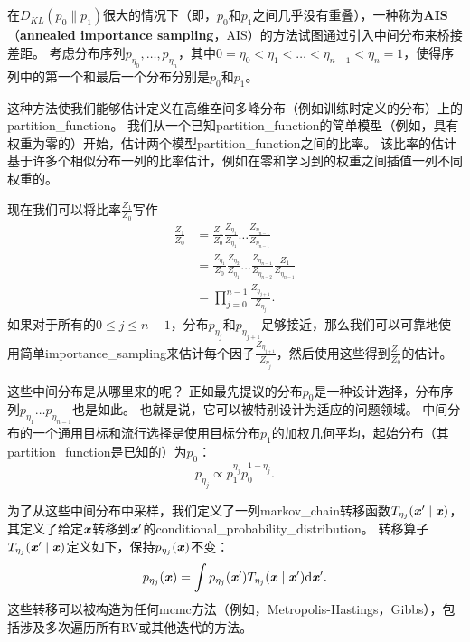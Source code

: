 \subsection{}
\label{sec:annealed_importance_sampling}
在$D_{KL}(p_0 \| p_1)$很大的情况下（即，$p_0$和$p_1$之间几乎没有重叠），一种称为\textbf{\gls{AIS}}（\textbf{annealed importance sampling}，AIS）的方法试图通过引入中间分布来桥接差距\citep{Jarzynski1997,Neal-2001}。
考虑分布序列$p_{\eta_0},\dots,p_{\eta_n}$，其中$0=\eta_0 < \eta_1 < \dots < \eta_{n-1} < \eta_n = 1$，使得序列中的第一个和最后一个分布分别是$p_0$和$p_1$。


这种方法使我们能够估计定义在高维空间多峰分布（例如训练时定义的分布）上的\gls{partition_function}。
我们从一个已知\gls{partition_function}的简单模型（例如，具有权重为零的）开始，估计两个模型\gls{partition_function}之间的比率。
该比率的估计基于许多个相似分布一列的比率估计，例如在零和学习到的权重之间插值一列不同权重的。


现在我们可以将比率$\frac{Z_1}{Z_0}$写作
\begin{align}
\frac{Z_1}{Z_0} &= \frac{Z_1}{Z_0} \frac{Z_{\eta_1}}{Z_{\eta_1}} \dots \frac{Z_{\eta_{n-1}}}{Z_{\eta_{n-1}}} \\
&= \frac{Z_{\eta_1}}{Z_{0}}  \frac{Z_{\eta_2}}{Z_{\eta_1}}  \dots \frac{Z_{\eta_{n-1}}}{Z_{\eta_{n-2}}} \frac{Z_{1}}{Z_{\eta_{n-1}}} \\
&= \prod_{j=0}^{n-1} \frac{ Z_{\eta_{j+1}} }{Z_{\eta_j}}. \label{eq:18.49}
\end{align}
如果对于所有的$0 \leq j \leq n-1$，分布$p_{\eta_j}$和$p_{\eta_{j+1}}$足够接近，那么我们可以可靠地使用简单\gls{importance_sampling}来估计每个因子$\frac{Z_{\eta_{j+1}}}{ Z_{\eta_j}}$，然后使用这些得到$\frac{Z_1}{Z_0}$的估计。


这些中间分布是从哪里来的呢？
正如最先提议的分布$p_0$是一种设计选择，分布序列$p_{\eta_1} \dots p_{\eta_{n-1}}$也是如此。
也就是说，它可以被特别设计为适应的问题领域。
中间分布的一个通用目标和流行选择是使用目标分布$p_1$的加权几何平均，起始分布（其\gls{partition_function}是已知的）为$p_0$：
\begin{equation}
	p_{\eta_j} \propto p_1^{\eta_j} p_0^{1-\eta_j}.
\end{equation}


为了从这些中间分布中采样，我们定义了一列\gls{markov_chain}转移函数$T_{\eta_j}(\boldsymbol{\mathit{x}}' \mid \boldsymbol{\mathit{x}})$，其定义了给定$\boldsymbol{\mathit{x}}$转移到$\boldsymbol{\mathit{x}}'$的\gls{conditional_probability_distribution}。
转移算子$T_{\eta_j}(\boldsymbol{\mathit{x}}' \mid \boldsymbol{\mathit{x}})$定义如下，保持$p_{\eta_j}(\boldsymbol{\mathit{x}})$不变：
\begin{equation}
	p_{\eta_j}(\boldsymbol{\mathit{x}}) = \int p_{\eta_j} (\boldsymbol{\mathit{x}}') T_{\eta_j} (\boldsymbol{\mathit{x}} \mid \boldsymbol{\mathit{x}}') \mathrm{d}\boldsymbol{\mathit{x}}'.
\end{equation}
这些转移可以被构造为任何\gls{mcmc}方法（例如，Metropolis-Hastings，Gibbs），包括涉及多次遍历所有\gls{RV}或其他迭代的方法。


